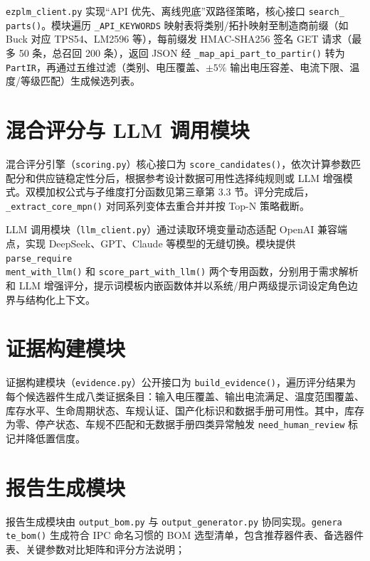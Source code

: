 \texttt{ezplm\_client.py} 实现“API 优先、离线兜底”双路径策略，核心接口 \texttt{search\_\\parts()}。模块遍历 \texttt{\_API\_KEYWORDS} 映射表将类别/拓扑映射至制造商前缀（如 Buck 对应 TPS54、LM2596 等），每前缀发 HMAC-SHA256 签名 GET 请求（最多 50 条，总召回 200 条），返回 JSON 经 \texttt{\_map\_api\_part\_to\_partir()} 转为 \texttt{PartIR}，再通过五维过滤（类别、电压覆盖、$\pm 5\%$ 输出电压容差、电流下限、温度/等级匹配）生成候选列表。

\section{混合评分与 LLM 调用模块}

混合评分引擎（\texttt{scoring.py}）核心接口为 \texttt{score\_candidates()}，依次计算参数匹配分和供应链稳定性分后，根据参考设计数据可用性选择纯规则或 LLM 增强模式。双模加权公式与子维度打分函数见第三章第 3.3 节。评分完成后，\texttt{\_extract\_core\_mpn()} 对同系列变体去重合并并按 Top-N 策略截断。

LLM 调用模块（\texttt{llm\_client.py}）通过读取环境变量动态适配 OpenAI 兼容端点，实现 DeepSeek、GPT、Claude 等模型的无缝切换。模块提供 \texttt{parse\_require\\ment\_with\_llm()} 和 \texttt{score\_part\_with\_llm()} 两个专用函数，分别用于需求解析和 LLM 增强评分，提示词模板内嵌函数体并以系统/用户两级提示词设定角色边界与结构化上下文。

\section{证据构建模块}

证据构建模块（\texttt{evidence.py}）公开接口为 \texttt{build\_evidence()}，遍历评分结果为每个候选器件生成八类证据条目：输入电压覆盖、输出电流满足、温度范围覆盖、库存水平、生命周期状态、车规认证、国产化标识和数据手册可用性。其中，库存为零、停产状态、车规不匹配和无数据手册四类异常触发 \texttt{need\_human\_review} 标记并降低置信度。

\section{报告生成模块}

报告生成模块由 \texttt{output\_bom.py} 与 \texttt{output\_generator.py} 协同实现。\texttt{genera\\te\_bom()} 生成符合 IPC 命名习惯的 BOM 选型清单，包含推荐器件表、备选器件表、关键参数对比矩阵和评分方法说明；

